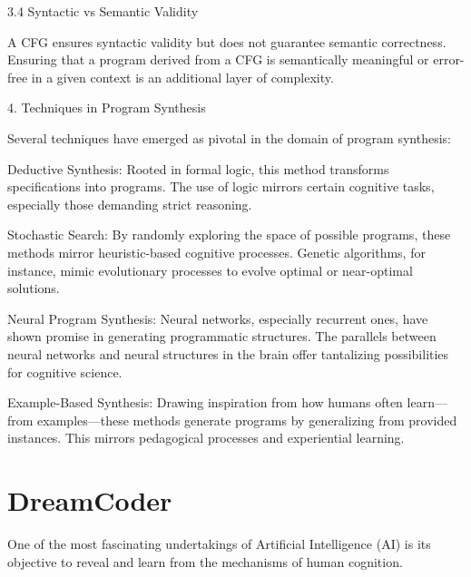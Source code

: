 3.4 Syntactic vs Semantic Validity

A CFG ensures syntactic validity but does not guarantee semantic correctness. Ensuring that a program derived from a CFG is semantically meaningful or error-free in a given context is an additional layer of complexity.




4. Techniques in Program Synthesis

Several techniques have emerged as pivotal in the domain of program synthesis:

Deductive Synthesis: Rooted in formal logic, this method transforms specifications into programs. The use of logic mirrors certain cognitive tasks, especially those demanding strict reasoning.

Stochastic Search: By randomly exploring the space of possible programs, these methods mirror heuristic-based cognitive processes. Genetic algorithms, for instance, mimic evolutionary processes to evolve optimal or near-optimal solutions.

Neural Program Synthesis: Neural networks, especially recurrent ones, have shown promise in generating programmatic structures. The parallels between neural networks and neural structures in the brain offer tantalizing possibilities for cognitive science.

Example-Based Synthesis: Drawing inspiration from how humans often learn—from examples—these methods generate programs by generalizing from provided instances. This mirrors pedagogical processes and experiential learning.



\section{DreamCoder}
One of the most fascinating undertakings of Artificial Intelligence (AI) is its objective to reveal and learn from the mechanisms of human cognition.

